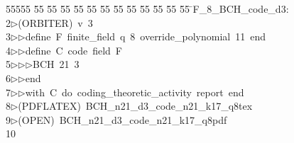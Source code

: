 %
%
\begin{tabbing}
55555 \= 55 \= 55 \= 55 \= 55 \= 55 \= 55 \= 55 \= 55 \= 55 \= 55 \= 55 \= 55 \= \>F\_8\_BCH\_code\_d3:\\[0pt]
2\>$\triangleright$\>(ORBITER)\ v\ 3\ \\[0pt]
3\>$\triangleright$\>$\triangleright$\>define\ F\ finite\_field\ q\ 8\ override\_polynomial\ 11\ end\ \\[0pt]
4\>$\triangleright$\>$\triangleright$\>define\ C\ code\ field\ F\ \\[0pt]
5\>$\triangleright$\>$\triangleright$\>$\triangleright$\>BCH\ 21\ 3\ \\[0pt]
6\>$\triangleright$\>$\triangleright$\>end\ \\[0pt]
7\>$\triangleright$\>$\triangleright$\>with\ C\ do\ coding\_theoretic\_activity\ report\ end\\[0pt]
8\>$\triangleright$\>(PDFLATEX)\ BCH\_n21\_d3\_code\_n21\_k17\_q8tex\\[0pt]
9\>$\triangleright$\>(OPEN)\ BCH\_n21\_d3\_code\_n21\_k17\_q8pdf\\[0pt]
10\>\end{tabbing}
